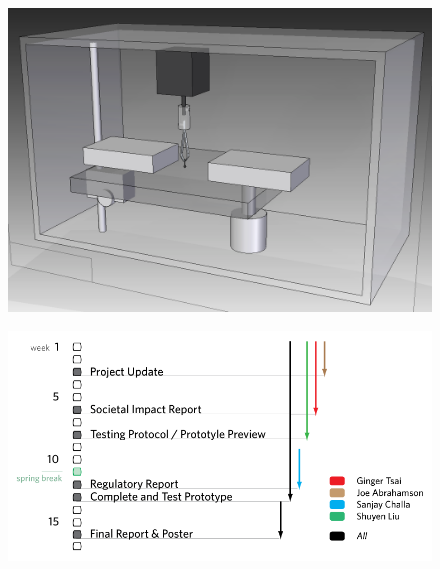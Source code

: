 \documentclass{article}
\begin{document}
\begin{figure}[h]
  \centering
  \includegraphics[width=\linewidth]{../img/render2}
  \label{fig:render2}
\end{figure}

\begin{figure}[h]
  \centering
  \includegraphics[width=0.75\linewidth]{../img/spring_gantt}
  \label{fig:gantt}
\end{figure}
\end{document}
